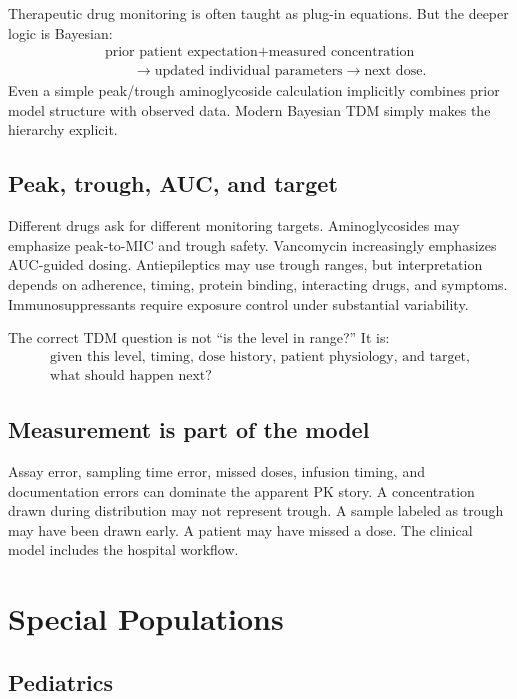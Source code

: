 \documentclass[a4paper]{article}
\begin{document}
Therapeutic drug monitoring is often taught as plug-in equations. But the deeper logic is Bayesian:
\[
  \begin{aligned}
  &\text{prior patient expectation}
  +\text{measured concentration}\\
  &\hspace{2em}\longrightarrow
  \text{updated individual parameters}
  \longrightarrow
  \text{next dose}.
  \end{aligned}
\]
Even a simple peak/trough aminoglycoside calculation implicitly combines prior model structure with observed data. Modern Bayesian TDM simply makes the hierarchy explicit.

\subsection{Peak, trough, AUC, and target}

Different drugs ask for different monitoring targets. Aminoglycosides may emphasize peak-to-MIC and trough safety. Vancomycin increasingly emphasizes AUC-guided dosing. Antiepileptics may use trough ranges, but interpretation depends on adherence, timing, protein binding, interacting drugs, and symptoms. Immunosuppressants require exposure control under substantial variability.

The correct TDM question is not ``is the level in range?'' It is:
\[
  \begin{gathered}
  \text{given this level, timing, dose history, patient physiology, and target,}\\
  \text{what should happen next?}
  \end{gathered}
\]

\subsection{Measurement is part of the model}

Assay error, sampling time error, missed doses, infusion timing, and documentation errors can dominate the apparent PK story. A concentration drawn during distribution may not represent trough. A sample labeled as trough may have been drawn early. A patient may have missed a dose. The clinical model includes the hospital workflow.

\section{Special Populations}

\subsection{Pediatrics}
\end{document}
